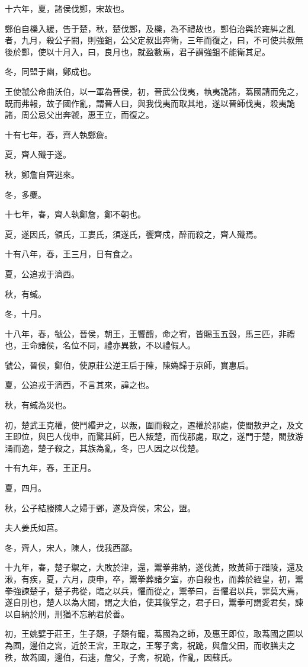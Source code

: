 \begin{pinyinscope}
十六年，夏，諸侯伐鄭，宋故也。

鄭伯自櫟入緩，告于楚，秋，楚伐鄭，及櫟，為不禮故也，鄭伯治與於雍糾之亂者，九月，殺公子閼，則強鉏，公父定叔出奔衛，三年而復之，曰，不可使共叔無後於鄭，使以十月入，曰，良月也，就盈數焉，君子謂強鉏不能衛其足。

冬，同盟于幽，鄭成也。

王使虢公命曲沃伯，以一軍為晉侯，初，晉武公伐夷，執夷詭諸，蒍國請而免之，既而弗報，故子國作亂，謂晉人曰，與我伐夷而取其地，遂以晉師伐夷，殺夷詭諸，周公忌父出奔虢，惠王立，而復之。

十有七年，春，齊人執鄭詹。

夏，齊人殲于遂。

秋，鄭詹自齊逃來。

冬，多麋。

十七年，春，齊人執鄭詹，鄭不朝也。

夏，遂因氏，領氏，工婁氏，須遂氏，饗齊戍，醉而殺之，齊人殲焉。

十有八年，春，王三月，日有食之。

夏，公追戎于濟西。

秋，有蜮。

冬，十月。

十八年，春，虢公，晉侯，朝王，王饗醴，命之宥，皆賜玉五瑴，馬三匹，非禮也，王命諸侯，名位不同，禮亦異數，不以禮假人。

虢公，晉侯，鄭伯，使原莊公逆王后于陳，陳媯歸于京師，實惠后。

夏，公追戎于濟西，不言其來，諱之也。

秋，有蜮為災也。

初，楚武王克權，使鬥緡尹之，以叛，圍而殺之，遷權於那處，使閻敖尹之，及文王即位，與巴人伐申，而驚其師，巴人叛楚，而伐那處，取之，遂門于楚，閻敖游涌而逸，楚子殺之，其族為亂，冬，巴人因之以伐楚。

十有九年，春，王正月。

夏，四月。

秋，公子結媵陳人之婦于鄄，遂及齊侯，宋公，盟。

夫人姜氏如莒。

冬，齊人，宋人，陳人，伐我西鄙。

十九年，春，楚子禦之，大敗於津，還，鬻拳弗納，遂伐黃，敗黃師于踖陵，還及湫，有疾，夏，六月，庚申，卒，鬻拳葬諸夕室，亦自殺也，而葬於絰皇，初，鬻拳強諫楚子，楚子弗從，臨之以兵，懼而從之，鬻拳曰，吾懼君以兵，罪莫大焉，遂自刖也，楚人以為大閽，謂之大伯，使其後掌之，君子曰，鬻拳可謂愛君矣，諫以自納於刑，刑猶不忘納君於善。

初，王姚嬖于莊王，生子頹，子頹有寵，蒍國為之師，及惠王即位，取蒍國之圃以為囿，邊伯之宮，近於王宮，王取之，王奪子禽，祝跪，與詹父田，而收膳夫之秩，故蒍國，邊伯，石速，詹父，子禽，祝跪，作亂，因蘇氏。


\end{pinyinscope}
